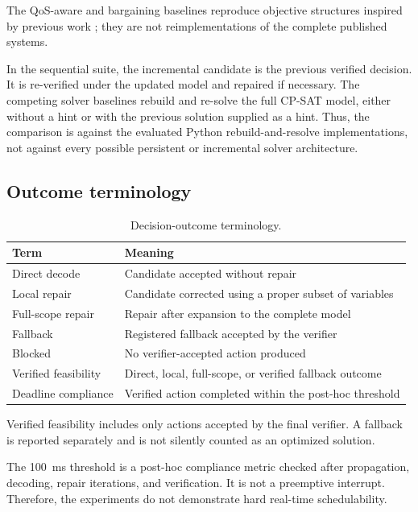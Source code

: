 \documentclass[pdflatex,sn-mathphys-num,iicol,oneside]{sn-jnl}
\newcommand{\cpsat}{\textsc{CP-SAT}\xspace}
\begin{document}
The QoS-aware and bargaining baselines reproduce objective structures
inspired by previous work
\cite{wadud2024qacm,wadud2023game}; they are not reimplementations of
the complete published systems.

In the sequential suite, the incremental candidate is the previous
verified decision. It is re-verified under the updated model and
repaired if necessary. The competing solver baselines rebuild and
re-solve the full \cpsat model, either without a hint or with the
previous solution supplied as a hint. Thus, the comparison is against
the evaluated Python rebuild-and-resolve implementations, not against
every possible persistent or incremental solver architecture.

\subsection{Outcome terminology}

\begin{table}[t]
\centering
\caption{Decision-outcome terminology.}
\label{tab:terminology}
\setlength{\tabcolsep}{4pt}
\small
\begin{tabular}{ll}
\toprule
Term & Meaning\\
\midrule
Direct decode & Candidate accepted without repair\\
Local repair & Candidate corrected using a proper subset of variables\\
Full-scope repair & Repair after expansion to the complete model\\
Fallback & Registered fallback accepted by the verifier\\
Blocked & No verifier-accepted action produced\\
Verified feasibility & Direct, local, full-scope, or verified fallback outcome\\
Deadline compliance & Verified action completed within the post-hoc threshold\\
\bottomrule
\end{tabular}
\end{table}

Verified feasibility includes only actions accepted by the final
verifier. A fallback is reported separately and is not silently
counted as an optimized solution.

The 100~ms threshold is a post-hoc compliance metric checked after
propagation, decoding, repair iterations, and verification. It is not
a preemptive interrupt. Therefore, the experiments do not demonstrate
hard real-time schedulability.
\end{document}
